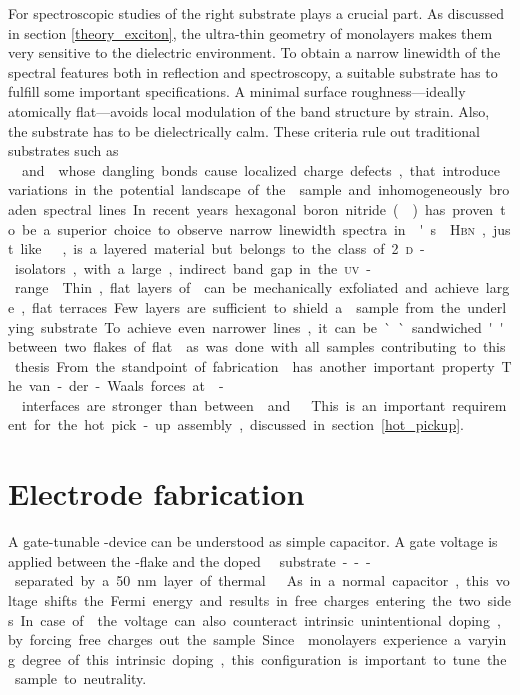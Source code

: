 For spectroscopic studies of \tmds the right substrate plays a crucial part. As discussed in section \ref{theory_exciton}, the ultra-thin geometry of \tmdg monolayers makes them very sensitive to the dielectric environment. To obtain a narrow linewidth of the spectral features both in reflection and \pl spectroscopy, a suitable substrate has to fulfill some important specifications. A minimal surface roughness---ideally atomically flat---avoids local modulation of the band structure by strain. Also, the substrate has to be dielectrically calm. These criteria rule out traditional substrates such as \si\ and \sio whose dangling bonds cause localized charge defects, that introduce variations in the potential landscape of the \tmdg sample and inhomogeneously broaden spectral lines. In recent years hexagonal boron nitride (\hbn) has proven to be a superior choice to observe narrow linewidth spectra in \tmd's \cite{courtade_spectrally_2018}. \textsc{Hbn}, just like \tmds\!, is a layered material but belongs to the class of 2\textsc{d}-isolators, with a large, indirect band gap in the \textsc{uv}-range \cite{arnaud_huge_2006}. Thin, flat layers of \hbng can be mechanically exfoliated and achieve large, flat terraces. Few layers are sufficient to shield a \tmdg sample from the underlying substrate. To achieve even narrower lines, it can be ``sandwiched'' between two flakes of flat \hbng as was done with all samples contributing to this thesis. From the standpoint of fabrication \hbng has another important property. The van-der-Waals forces at \hbn-\tmdg interfaces are stronger than between \tmds and \sio\!. This is an important requirement for the hot pick-up assembly, discussed in section \ref{hot_pickup}.

\section{Electrode fabrication}

A gate-tunable \tmd-device can be understood as simple capacitor. A gate voltage is applied between the \tmd-flake and the doped \si\ substrate---separated by a 50 nm layer of thermal \sio\!. As in a normal capacitor, this voltage shifts the Fermi energy and results in free charges entering the two sides. In case of \tmds the voltage can also counteract intrinsic unintentional doping, by forcing free charges out the sample. Since \tmdg monolayers experience a varying degree of this intrinsic doping, this configuration is important to tune the sample to neutrality.

